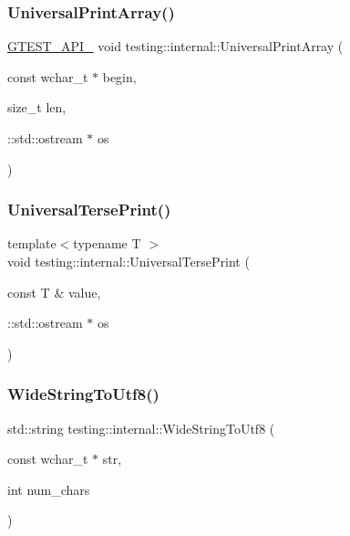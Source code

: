 \subsubsection{\texorpdfstring{Universal\+Print\+Array()}{UniversalPrintArray()}\hspace{0.1cm}{\footnotesize\ttfamily [5/5]}}
{\footnotesize\ttfamily \hyperlink{gtest-port_8h_aa73be6f0ba4a7456180a94904ce17790}{G\+T\+E\+S\+T\+\_\+\+A\+P\+I\+\_\+} void testing\+::internal\+::\+Universal\+Print\+Array (\begin{DoxyParamCaption}\item[{const wchar\+\_\+t $\ast$}]{begin,  }\item[{size\+\_\+t}]{len,  }\item[{\+::std\+::ostream $\ast$}]{os }\end{DoxyParamCaption})}

\mbox{\label{namespacetesting_1_1internal_afa92f5a284929dc3723e654a25feb7b9}} 
\subsubsection{\texorpdfstring{Universal\+Terse\+Print()}{UniversalTersePrint()}}
{\footnotesize\ttfamily template$<$typename T $>$ \\
void testing\+::internal\+::\+Universal\+Terse\+Print (\begin{DoxyParamCaption}\item[{const T \&}]{value,  }\item[{\+::std\+::ostream $\ast$}]{os }\end{DoxyParamCaption})}

\mbox{\label{namespacetesting_1_1internal_a05b8c86ff38243f34d8f839a0eadefb1}} 
\subsubsection{\texorpdfstring{Wide\+String\+To\+Utf8()}{WideStringToUtf8()}}
{\footnotesize\ttfamily std\+::string testing\+::internal\+::\+Wide\+String\+To\+Utf8 (\begin{DoxyParamCaption}\item[{const wchar\+\_\+t $\ast$}]{str,  }\item[{int}]{num\+\_\+chars }\end{DoxyParamCaption})}

